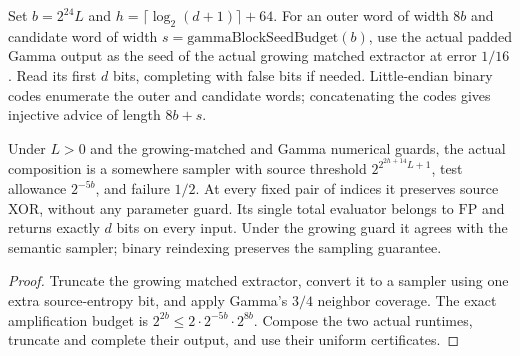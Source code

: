 \begin{definition}
  \label{def:lowerbounds-algebraic-amplified-matched-sampler}
  \leanok
  Set $b=2^{24}L$ and $h=\lceil\log_2(d+1)\rceil+64$.
  For an outer word of width $8b$ and candidate word of width
  $s=\mathrm{gammaBlockSeedBudget}(b)$, use the actual padded Gamma
  output as the seed of the actual growing matched extractor at error
  $1/16$. Read its first $d$ bits, completing with false bits if needed.
  Little-endian binary codes enumerate the outer and candidate words;
  concatenating the codes gives injective advice of length $8b+s$.
\end{definition}

\begin{theorem}
  \label{thm:lowerbounds-algebraic-amplified-matched-sampler}
  \leanok
  Under $L>0$ and the growing-matched and Gamma numerical guards, the
  actual composition is a somewhere sampler with source threshold
  $2^{2^{2h+14}L+1}$, test allowance $2^{-5b}$, and failure $1/2$.
  At every fixed pair of indices it preserves source XOR, without any
  parameter guard. Its single total evaluator belongs to $\mathrm{FP}$
  and returns exactly $d$ bits on every input. Under the growing guard
  it agrees with the semantic sampler; binary reindexing preserves the
  sampling guarantee.
\end{theorem}
\begin{proof}
  \leanok
  Truncate the growing matched extractor, convert it to a sampler using
  one extra source-entropy bit, and apply Gamma's $3/4$ neighbor coverage.
  The exact amplification budget is
  $2^{2b}\le 2\cdot2^{-5b}\cdot2^{8b}$. Compose the two actual runtimes,
  truncate and complete their output, and use their uniform certificates.
\end{proof}


